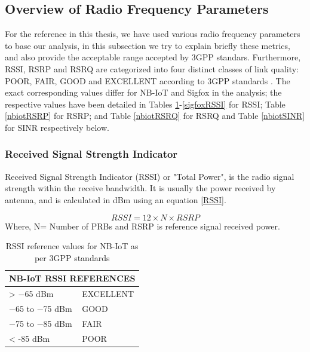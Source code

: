 \documentclass[12pt]{article}
\begin{document}
\subsection{Overview of Radio Frequency Parameters}\label{overview of RF}

For the reference in this thesis, we have used various radio frequency parameters to base our analysis, in this subsection we try to explain briefly these metrics, and also provide the acceptable range accepted by 3GPP standars. Furthermore, RSSI, RSRP and RSRQ are categorized into four distinct classes of link quality: POOR, FAIR, GOOD and EXCELLENT according to 3GPP standards \cite{3GPP,sikora2019performance}. The exact corresponding values differ for NB-IoT and Sigfox in the analysis; the respective values have been detailed in Tables \ref{nbiotRSSI}-\ref{sigfoxRSSI} for RSSI;  Table \ref{nbiotRSRP} for RSRP; and Table \ref{nbiotRSRQ} for RSRQ and Table \ref{nbiotSINR} for SINR respectively below.


\subsubsection{Received Signal Strength Indicator}
Received Signal Strength Indicator (RSSI) or "Total  Power", is the radio  signal  strength  within  the  receive bandwidth. It is usually the power received by antenna, and is  calculated in dBm using an equation \ref{RSSI}.

\begin{equation}
      RSSI = {12 \times N \times RSRP}
      \label{RSSI}
\end{equation}
Where, N= Number of PRBs and RSRP is reference signal received power.

\begin{table}[h]

\centering
\caption {RSSI reference values for NB-IoT as per 3GPP standards \cite{3GPP,sikora2019performance}}

\begin{tabular}{|p{5cm}|p{5cm}|}
\hline
\multicolumn{2}{|c|}{NB-IoT RSSI REFERENCES} \\ \hline
 > −65 dBm                           & EXCELLENT                     \\ \hline
−65 to −75 dBm                      & GOOD                          \\ \hline
−75 to −85 dBm                      & FAIR                          \\ \hline
< -85 dBm                           & POOR                          \\ \hline
\end{tabular}
\label{nbiotRSSI}

\end{table}
\end{document}
